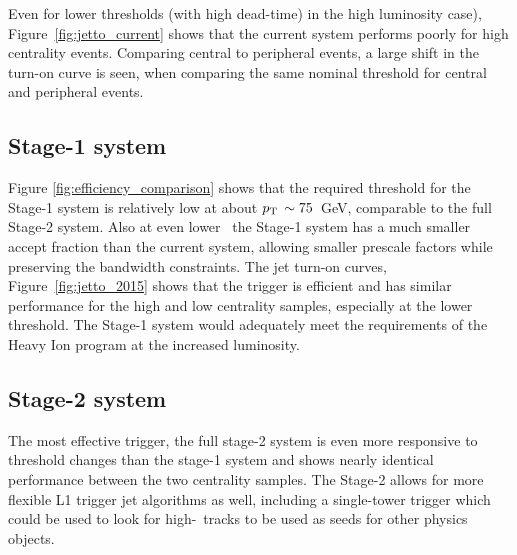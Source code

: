 Even for lower thresholds (with high dead-time) in the high luminosity case),
Figure~\ref{fig:jetto_current} shows that the current system performs poorly 
for high centrality events. Comparing central to peripheral events, a large
shift in the turn-on curve is seen, when comparing the same nominal threshold
for central and peripheral events.

\subsection{Stage-1 system}

Figure \ref{fig:efficiency_comparison} shows that the required threshold for
the Stage-1 system is relatively low at about $p_{\rm T}\, \sim 75$~GeV, 
comparable to the full Stage-2 system. Also at even lower \pt\ the Stage-1 system
has a much smaller accept fraction than the current system, allowing smaller 
prescale factors while preserving the bandwidth constraints.
The jet turn-on curves, Figure~\ref{fig:jetto_2015} 
shows that the trigger is efficient and has similar performance for the
high and low centrality samples, 
especially at the lower threshold. The Stage-1 system would adequately meet the
requirements of the Heavy Ion program at the increased luminosity.

\subsection{Stage-2 system}

The most effective trigger, the full stage-2 system is even more responsive
to threshold changes 
than the stage-1 system and shows nearly identical performance between the two
centrality samples. 
The Stage-2 allows for more flexible L1 trigger jet algorithms as well,
including a single-tower trigger which could be used to look for high-\pt\
tracks to be used as seeds for other physics objects.

